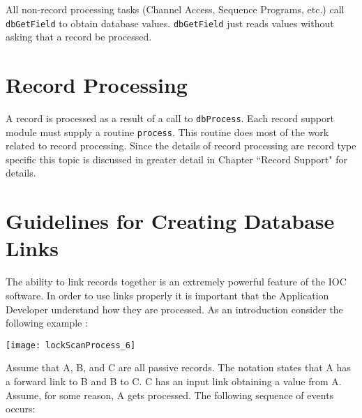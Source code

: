 All non-record processing tasks (Channel Access, Sequence Programs, etc.) call \verb|dbGetField| to obtain database values. 
\verb|dbGetField| just reads values without asking that a record be processed.

\section{Record Processing}

A record is processed as a result of a call to \verb|dbProcess|. Each record support module must supply a routine \verb|process|. 
This routine does most of the work related to record processing. Since the details of record processing are record type 
specific this topic is discussed in greater detail in Chapter ``Record Support" for details.

\section{Guidelines for Creating Database Links}

The ability to link records together is an extremely powerful feature of the IOC software. In order to use links properly it 
is important that the Application Developer understand how they are processed. As an introduction consider the following 
example :

\begin{center}
\texttt{[image: lockScanProcess\_6]}
\end{center}

Assume that A, B, and C are all passive records. The notation states that A has a forward link to B and B to C. C has an 
input link obtaining a value from A. Assume, for some reason, A gets processed. The following sequence of events 
occurs:

